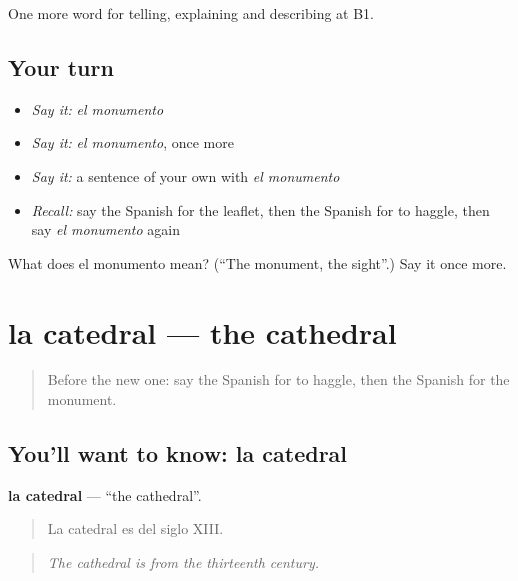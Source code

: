 \begin{grammarlens}[title={What you've built}]
One more word for telling, explaining and describing at B1.
\end{grammarlens}

\subsection*{Your turn}
\begin{itemize}
\raggedright
  \item \emph{Say it:} \emph{el monumento}
  \item \emph{Say it:} \emph{el monumento}, once more
  \item \emph{Say it:} a sentence of your own with \emph{el monumento}
  \item \emph{Recall:} say the Spanish for the leaflet, then the Spanish for to haggle, then say \emph{el monumento} again
\end{itemize}

\begin{tcolorbox}[breakable,colback=teal!4,colframe=teal!35!black,title={Before you move on}]
What does el monumento mean? (\textquotedblleft{}The monument, the sight\textquotedblright{}.) Say it once more.
\end{tcolorbox}
\section[la catedral]{la catedral — the cathedral}

\label{lesson:ES-C677-catedral}



\begin{quote}
Before the new one: say the Spanish for to haggle, then the Spanish for the monument.
\end{quote}

\subsection*{You'll want to know: la catedral}
\textbf{la catedral} — \textquotedblleft{}the cathedral\textquotedblright{}.

\begin{quote}
La catedral es del siglo XIII.
\end{quote}

\begin{quote}
\emph{The cathedral is from the thirteenth century.}
\end{quote}

